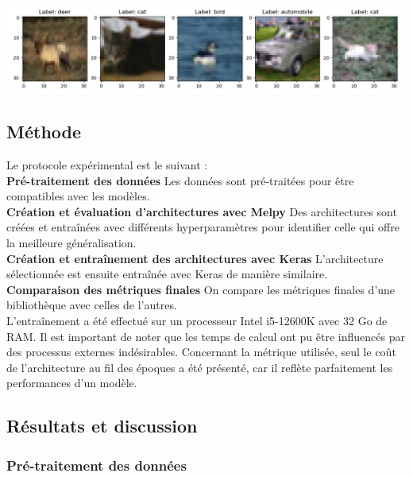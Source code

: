 \begin{multicols}{2}
\includegraphics[width=\columnwidth]{images/cifar10_samples.png}
\hfill\break

\subsection{Méthode}

Le protocole expérimental est le suivant :  \\


\textbf{Pré-traitement des données} Les données sont pré-traitées 
pour être compatibles avec les modèles.\\

\textbf{Création et évaluation d’architectures avec Melpy} Des architectures sont créées 
et entraînées avec différents hyperparamètres pour identifier celle qui offre 
la meilleure généralisation.\\

\textbf{Création et entraînement des architectures avec Keras} L'architecture
sélectionnée est ensuite entraînée avec Keras de manière similaire. \\


\textbf{Comparaison des métriques finales} On compare les métriques finales d'une bibliothèque
avec celles de l'autres. \\

L’entraînement a été effectué sur un processeur Intel i5-12600K avec 32 Go de RAM. Il est important de 
noter que les temps de calcul ont pu être influencés par des processus externes indésirables. Concernant 
la métrique utilisée, seul le coût de l’architecture au fil des époques a été présenté, car il reflète 
parfaitement les performances d’un modèle. \\


\subsection{Résultats et discussion}

\subsubsection{Pré-traitement des données}


\end{multicols}
